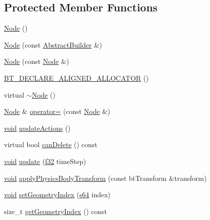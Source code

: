 \subsection*{Protected Member Functions}
\begin{DoxyCompactItemize}
\item 
\mbox{\hyperlink{classnjli_1_1_node_a91aae9499658e92fc326ea9f9e1678f6}{Node}} ()
\item 
\mbox{\hyperlink{classnjli_1_1_node_a5d925e98c91ec97042a0c91e9602edff}{Node}} (const \mbox{\hyperlink{classnjli_1_1_abstract_builder}{Abstract\+Builder}} \&)
\item 
\mbox{\hyperlink{classnjli_1_1_node_a97a94f2f5f107c86d284238cc95602bf}{Node}} (const \mbox{\hyperlink{classnjli_1_1_node}{Node}} \&)
\item 
\mbox{\hyperlink{classnjli_1_1_node_a8b08e4f3293dea50b2cf7ea54d217fa7}{B\+T\+\_\+\+D\+E\+C\+L\+A\+R\+E\+\_\+\+A\+L\+I\+G\+N\+E\+D\+\_\+\+A\+L\+L\+O\+C\+A\+T\+OR}} ()
\item 
virtual \mbox{\hyperlink{classnjli_1_1_node_a256fc357da68d049b40baa98b00dfcec}{$\sim$\+Node}} ()
\item 
\mbox{\hyperlink{classnjli_1_1_node}{Node}} \& \mbox{\hyperlink{classnjli_1_1_node_a489763eb75c752e2d650b1ae81b08fbc}{operator=}} (const \mbox{\hyperlink{classnjli_1_1_node}{Node}} \&)
\item 
\mbox{\hyperlink{_thread_8h_af1e856da2e658414cb2456cb6f7ebc66}{void}} \mbox{\hyperlink{classnjli_1_1_node_aafd87adc70ed57be9d7f045a1be3412c}{update\+Actions}} ()
\item 
virtual bool \mbox{\hyperlink{classnjli_1_1_node_a23f6a6a0cf8fd344d0687f4e35de7e98}{can\+Delete}} () const
\item 
\mbox{\hyperlink{_thread_8h_af1e856da2e658414cb2456cb6f7ebc66}{void}} \mbox{\hyperlink{classnjli_1_1_node_a3eb1db3aa2681e4acaf3e9e95fd01e69}{update}} (\mbox{\hyperlink{_util_8h_a5f6906312a689f27d70e9d086649d3fd}{f32}} time\+Step)
\item 
\mbox{\hyperlink{_thread_8h_af1e856da2e658414cb2456cb6f7ebc66}{void}} \mbox{\hyperlink{classnjli_1_1_node_affbb98fea9966349be743de38256e355}{apply\+Physics\+Body\+Transform}} (const bt\+Transform \&transform)
\item 
\mbox{\hyperlink{_thread_8h_af1e856da2e658414cb2456cb6f7ebc66}{void}} \mbox{\hyperlink{classnjli_1_1_node_ab3dd16a4322896c94bc1a398e3466163}{set\+Geometry\+Index}} (\mbox{\hyperlink{_util_8h_a4258bfb2c3a440d06c4aaa3c2b450dde}{s64}} index)
\item 
size\+\_\+t \mbox{\hyperlink{classnjli_1_1_node_a4e29b0c0c0f159296453314e306f4712}{get\+Geometry\+Index}} () const

\end{DoxyCompactItemize}
